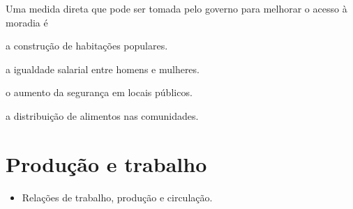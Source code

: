 \noindent{}Uma medida direta que pode ser tomada pelo governo para melhorar o
acesso à moradia é

\begin{escolha}
\item a construção de habitações populares.

\item a igualdade salarial entre homens e mulheres.

\item o aumento da segurança em locais públicos.

\item a distribuição de alimentos nas comunidades.
\end{escolha}


\chapter{Produção e trabalho}



\begin{itemize}
\item Relações de trabalho, produção e circulação.
\end{itemize}


